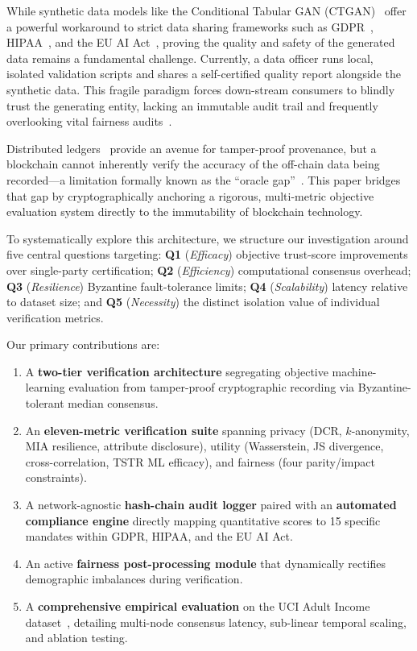 
While synthetic data models like the Conditional Tabular GAN (CTGAN)~\cite{xu2019ctgan} offer a powerful workaround to strict data sharing frameworks such as GDPR~\cite{gdpr2016regulation}, HIPAA~\cite{hipaa1996act}, and the EU AI Act~\cite{euaiact2024}, proving the quality and safety of the generated data remains a fundamental challenge. Currently, a data officer runs local, isolated validation scripts and shares a self-certified quality report alongside the synthetic data. This fragile paradigm forces down-stream consumers to blindly trust the generating entity, lacking an immutable audit trail and frequently overlooking vital fairness audits~\cite{hardt2016equality}.

Distributed ledgers~\cite{nakamoto2008bitcoin} provide an avenue for tamper-proof provenance, but a blockchain cannot inherently verify the accuracy of the off-chain data being recorded---a limitation formally known as the ``oracle gap''~\cite{zheng2018blockchain}. This paper bridges that gap by cryptographically anchoring a rigorous, multi-metric objective evaluation system directly to the immutability of blockchain technology. 

To systematically explore this architecture, we structure our investigation around five central questions targeting: \textbf{Q1} (\textit{Efficacy}) objective trust-score improvements over single-party certification; \textbf{Q2} (\textit{Efficiency}) computational consensus overhead; \textbf{Q3} (\textit{Resilience}) Byzantine fault-tolerance limits; \textbf{Q4} (\textit{Scalability}) latency relative to dataset size; and \textbf{Q5} (\textit{Necessity}) the distinct isolation value of individual verification metrics.

Our primary contributions are:
\begin{enumerate}[leftmargin=*, itemsep=1pt]
  \item A \textbf{two-tier verification architecture} segregating objective machine-learning evaluation from tamper-proof cryptographic recording via Byzantine-tolerant median consensus.
  \item An \textbf{eleven-metric verification suite} spanning privacy (DCR, $k$-anonymity, MIA resilience, attribute disclosure), utility (Wasserstein, JS divergence, cross-correlation, TSTR ML efficacy), and fairness (four parity/impact constraints).
  \item A network-agnostic \textbf{hash-chain audit logger} paired with an \textbf{automated compliance engine} directly mapping quantitative scores to 15 specific mandates within GDPR, HIPAA, and the EU AI Act.
  \item An active \textbf{fairness post-processing module} that dynamically rectifies demographic imbalances during verification.
  \item A \textbf{comprehensive empirical evaluation} on the UCI Adult Income dataset~\cite{dua2019uci}, detailing multi-node consensus latency, sub-linear temporal scaling, and ablation testing.
\end{enumerate}
